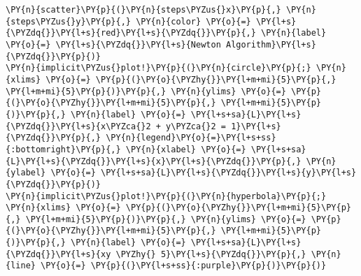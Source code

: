     \begin{tcolorbox}[breakable, size=fbox, boxrule=1pt, pad at break*=1mm,colback=cellbackground, colframe=cellborder]
\begin{Verbatim}[commandchars=\\\{\}]
\PY{n}{scatter}\PY{p}{(}\PY{n}{steps\PYZus{}x}\PY{p}{,} \PY{n}{steps\PYZus{}y}\PY{p}{,} \PY{n}{color} \PY{o}{=} \PY{l+s}{\PYZdq{}}\PY{l+s}{red}\PY{l+s}{\PYZdq{}}\PY{p}{,} \PY{n}{label} \PY{o}{=} \PY{l+s}{\PYZdq{}}\PY{l+s}{Newton Algorithm}\PY{l+s}{\PYZdq{}}\PY{p}{)}
\PY{n}{implicit\PYZus{}plot!}\PY{p}{(}\PY{n}{circle}\PY{p}{;} \PY{n}{xlims} \PY{o}{=} \PY{p}{(}\PY{o}{\PYZhy{}}\PY{l+m+mi}{5}\PY{p}{,} \PY{l+m+mi}{5}\PY{p}{)}\PY{p}{,} \PY{n}{ylims} \PY{o}{=} \PY{p}{(}\PY{o}{\PYZhy{}}\PY{l+m+mi}{5}\PY{p}{,} \PY{l+m+mi}{5}\PY{p}{)}\PY{p}{,} \PY{n}{label} \PY{o}{=} \PY{l+s+sa}{L}\PY{l+s}{\PYZdq{}}\PY{l+s}{x\PYZca{}2 + y\PYZca{}2 = 1}\PY{l+s}{\PYZdq{}}\PY{p}{,} \PY{n}{legend}\PY{o}{=}\PY{l+s+ss}{:bottomright}\PY{p}{,} \PY{n}{xlabel} \PY{o}{=} \PY{l+s+sa}{L}\PY{l+s}{\PYZdq{}}\PY{l+s}{x}\PY{l+s}{\PYZdq{}}\PY{p}{,} \PY{n}{ylabel} \PY{o}{=} \PY{l+s+sa}{L}\PY{l+s}{\PYZdq{}}\PY{l+s}{y}\PY{l+s}{\PYZdq{}}\PY{p}{)}
\PY{n}{implicit\PYZus{}plot!}\PY{p}{(}\PY{n}{hyperbola}\PY{p}{;} \PY{n}{xlims} \PY{o}{=} \PY{p}{(}\PY{o}{\PYZhy{}}\PY{l+m+mi}{5}\PY{p}{,} \PY{l+m+mi}{5}\PY{p}{)}\PY{p}{,} \PY{n}{ylims} \PY{o}{=} \PY{p}{(}\PY{o}{\PYZhy{}}\PY{l+m+mi}{5}\PY{p}{,} \PY{l+m+mi}{5}\PY{p}{)}\PY{p}{,} \PY{n}{label} \PY{o}{=} \PY{l+s+sa}{L}\PY{l+s}{\PYZdq{}}\PY{l+s}{xy \PYZhy{} 5}\PY{l+s}{\PYZdq{}}\PY{p}{,} \PY{n}{line} \PY{o}{=} \PY{p}{(}\PY{l+s+ss}{:purple}\PY{p}{)}\PY{p}{)}
\end{Verbatim}
\end{tcolorbox}

    \begin{center}
    \end{center}
    { \hspace*{\fill} \\}